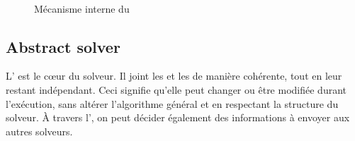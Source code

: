 \documentclass{jfpc-preprint}
\begin{document}
\begin{figure}
	\centering
	\\%
	\caption[]{Mécanisme interne du \opch}
	\label{fig:ochperform}
\end{figure}%

\subsection{Abstract solver}

L'\as{}  est le c\oe{}ur du solveur. Il joint les \oms{} et les \opchs{} de  manière cohérente, tout en leur restant  indépendant. Ceci signifie  qu'elle peut  changer ou  être modifiée  durant l'exécution, sans altérer  l'algorithme général  et en  respectant la  structure du solveur.  À  travers  l'\as, on peut décider également des informations à envoyer aux autres solveurs. 
\end{document}
